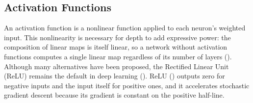\documentclass[12pt]{article}
\begin{document}
\subsection{Activation Functions}
\label{subsec:activation-functions} 



An activation function is a nonlinear function applied to each neuron's weighted input. 
This nonlinearity is necessary for depth to add expressive power: the composition of linear maps is itself linear, 
so a network without activation functions computes a single linear map regardless of its number of layers (\cite{dubey_activation_2022}).
Although many alternatives have been proposed, the Rectified Linear Unit (ReLU) remains the default in deep learning (\cite{ramachandran_searching_2017}).
ReLU (\cite{nair_rectified_2010}) outputs zero for negative inputs and the input itself for positive ones, and it accelerates stochastic gradient descent because its gradient is constant on the positive half-line.
\end{document}
